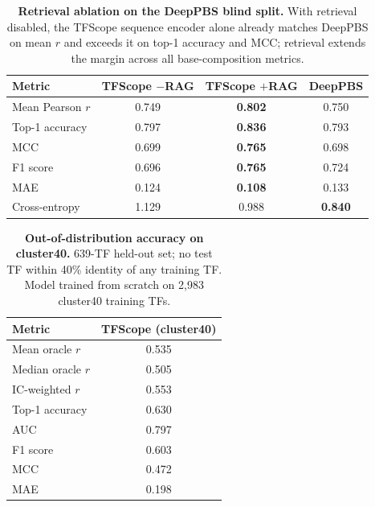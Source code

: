 \documentclass[11pt,letterpaper]{article}
\begin{document}
\begin{table}[p]
\centering
\caption{\textbf{Retrieval ablation on the DeepPBS blind split.}
  With retrieval disabled, the TFScope sequence encoder alone already matches
  DeepPBS on mean $r$ and exceeds it on top-1 accuracy and MCC; retrieval extends
  the margin across all base-composition metrics.}
\label{tab:rag}
\smallskip
\renewcommand{\arraystretch}{1.2}
\begin{tabular}{@{}lccc@{}}
\toprule
\textbf{Metric} & \textbf{TFScope $-$RAG} & \textbf{TFScope $+$RAG} & \textbf{DeepPBS} \\
\midrule
Mean Pearson $r$ & 0.749 & \textbf{0.802} & 0.750 \\
Top-1 accuracy   & 0.797 & \textbf{0.836} & 0.793 \\
MCC              & 0.699 & \textbf{0.765} & 0.698 \\
F1 score         & 0.696 & \textbf{0.765} & 0.724 \\
MAE              & 0.124 & \textbf{0.108} & 0.133 \\
Cross-entropy    & 1.129 & 0.988          & \textbf{0.840} \\
\bottomrule
\end{tabular}
\end{table}

\begin{table}[p]
\centering
\caption{\textbf{Out-of-distribution accuracy on cluster40.}
  639-TF held-out set; no test TF within 40\% identity of any training TF. Model
  trained from scratch on 2,983 cluster40 training TFs.}
\label{tab:ood}
\smallskip
\renewcommand{\arraystretch}{1.2}
\begin{tabular}{@{}lc@{}}
\toprule
\textbf{Metric} & \textbf{TFScope (cluster40)} \\
\midrule
Mean oracle $r$   & 0.535 \\
Median oracle $r$ & 0.505 \\
IC-weighted $r$   & 0.553 \\
Top-1 accuracy    & 0.630 \\
AUC               & 0.797 \\
F1 score          & 0.603 \\
MCC               & 0.472 \\
MAE               & 0.198 \\
\bottomrule
\end{tabular}
\end{table}
\end{document}
